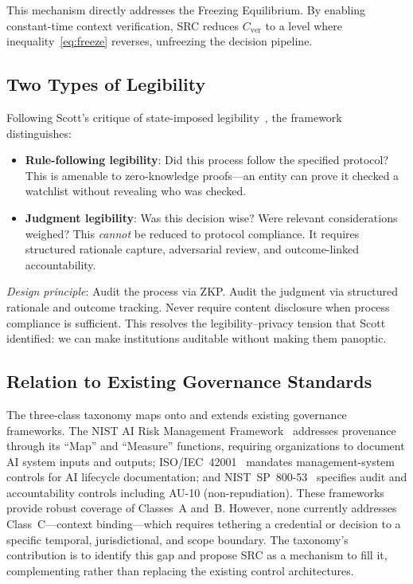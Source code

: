 \documentclass[runningheads]{llncs}
\begin{document}
This mechanism directly addresses the Freezing Equilibrium. By enabling constant-time context verification, SRC reduces $C_{\mathrm{ver}}$ to a level where inequality~\eqref{eq:freeze} reverses, unfreezing the decision pipeline.

\subsection{Two Types of Legibility}

Following Scott's critique of state-imposed legibility~\cite{scott1998seeing,rao2010legibility}, the framework distinguishes:

\begin{itemize}
\item \textbf{Rule-following legibility}: Did this process follow the specified protocol? This is amenable to zero-knowledge proofs---an entity can prove it checked a watchlist without revealing who was checked.
\item \textbf{Judgment legibility}: Was this decision wise? Were relevant considerations weighed? This \emph{cannot} be reduced to protocol compliance. It requires structured rationale capture, adversarial review, and outcome-linked accountability.
\end{itemize}

\emph{Design principle}: Audit the process via ZKP. Audit the judgment via structured rationale and outcome tracking. Never require content disclosure when process compliance is sufficient. This resolves the legibility--privacy tension that Scott identified: we can make institutions auditable without making them panoptic.

\subsection{Relation to Existing Governance Standards}

The three-class taxonomy maps onto and extends existing governance frameworks. The NIST AI Risk Management Framework~\cite{nist2023airm,nist2024genai} addresses provenance through its ``Map'' and ``Measure'' functions, requiring organizations to document AI system inputs and outputs; ISO/IEC~42001~\cite{iso42001} mandates management-system controls for AI lifecycle documentation; and NIST~SP~800-53~\cite{nist2020sp800} specifies audit and accountability controls including AU-10 (non-repudiation). These frameworks provide robust coverage of Classes~A and~B. However, none currently addresses Class~C---context binding---which requires tethering a credential or decision to a specific temporal, jurisdictional, and scope boundary. The taxonomy's contribution is to identify this gap and propose SRC as a mechanism to fill it, complementing rather than replacing the existing control architectures.
\end{document}
